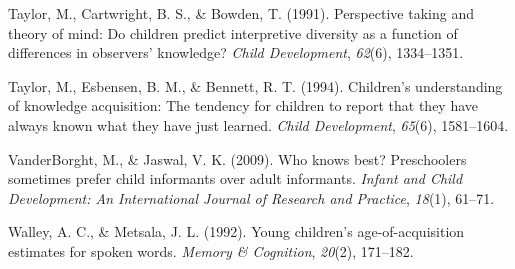 \documentclass[10pt, letterpaper]{article}
\begin{document}
\leavevmode\hypertarget{ref-taylor1991}{}%
Taylor, M., Cartwright, B. S., \& Bowden, T. (1991). Perspective taking
and theory of mind: Do children predict interpretive diversity as a
function of differences in observers' knowledge? \emph{Child
Development}, \emph{62}(6), 1334--1351.

\leavevmode\hypertarget{ref-taylor1994}{}%
Taylor, M., Esbensen, B. M., \& Bennett, R. T. (1994). Children's
understanding of knowledge acquisition: The tendency for children to
report that they have always known what they have just learned.
\emph{Child Development}, \emph{65}(6), 1581--1604.

\leavevmode\hypertarget{ref-vanderborght2009}{}%
VanderBorght, M., \& Jaswal, V. K. (2009). Who knows best? Preschoolers
sometimes prefer child informants over adult informants. \emph{Infant
and Child Development: An International Journal of Research and
Practice}, \emph{18}(1), 61--71.

\leavevmode\hypertarget{ref-walley1992}{}%
Walley, A. C., \& Metsala, J. L. (1992). Young children's
age-of-acquisition estimates for spoken words. \emph{Memory \&
Cognition}, \emph{20}(2), 171--182.


\end{document}
